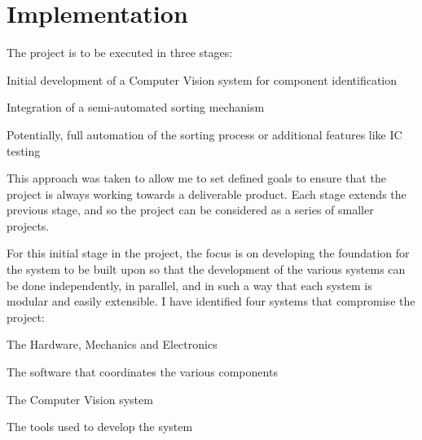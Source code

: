 \section{Implementation}
The project is to be executed in three stages:
\begin{mylist}
  \item Initial development of a Computer Vision system for component identification
  \item Integration of a semi-automated sorting mechanism
  \item Potentially, full automation of the sorting process or additional features like IC testing
\end{mylist}
This approach was taken to allow me to set defined goals to ensure that the project is always working towards a deliverable product.
Each stage extends the previous stage, and so the project can be considered as a series of smaller projects. 

For this initial stage in the project, the focus is on developing the foundation for the system to be built upon so that
the development of the various systems can be done independently, in parallel, and in such a way that each system
is modular and easily extensible.
I have identified four systems that compromise the project:
\begin{mylist}
  \item The Hardware, Mechanics and Electronics
  \item The software that coordinates the various components
  \item The Computer Vision system
  \item The tools used to develop the system
\end{mylist}



